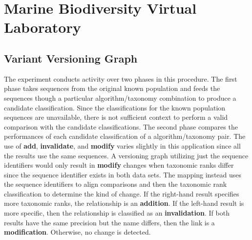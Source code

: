 \section{Marine Biodiversity Virtual Laboratory}

\subsection{Variant Versioning Graph}

The experiment conducts activity over two phases in this procedure.
The first phase takes sequences from the original known population and feeds the sequences though a particular algorithm/taxonomy combination to produce a candidate classification.
Since the classifications for the known population sequences are unavailable, there is not sufficient context to perform a valid comparison with the candidate classifications.
The second phase compares the performances of each candidate classification of a algorithm/taxonomy pair.
The use of \textbf{add}, \textbf{invalidate}, and \textbf{modify} varies slightly in this application since all the results use the same sequences.
A versioning graph utilizing just the sequence identifiers would only result in \textbf{modify} changes when taxonomic ranks differ since the sequence identifier exists in both data sets.
The mapping instead uses the sequence identifiers to align comparisons and then the taxonomic rank classification to determine the kind of change.
If the right-hand result specifies more taxonomic ranks, the relationship is an \textbf{addition}.
If the left-hand result is more specific, then the relationship is classified as an \textbf{invalidation}.
If both results have the same precision but the name differs, then the link is a \textbf{modification}.
Otherwise, no change is detected.

